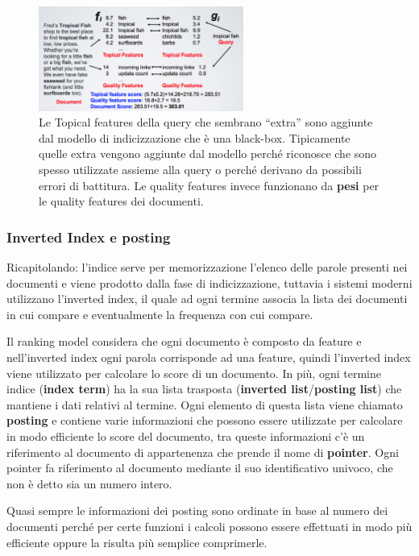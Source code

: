 \begin{figure}[htbp]
	\centering
	\includegraphics[width=0.6\textwidth]{./images/l6-modello-2}
	\caption{Le Topical features della query che sembrano ``extra'' sono aggiunte dal modello di indicizzazione che è una black-box. Tipicamente quelle extra vengono aggiunte dal modello perché riconosce che sono spesso utilizzate assieme alla query o perché derivano da possibili errori di battitura. Le quality features invece funzionano da \textbf{pesi} per le quality features dei documenti.}
\end{figure}

\subsubsection{Inverted Index e posting}

Ricapitolando: l'indice serve per memorizzazione l'elenco delle parole presenti nei documenti e viene prodotto dalla fase di indicizzazione, tuttavia i sistemi moderni utilizzano l'inverted index, il quale ad ogni termine associa la lista dei documenti in cui compare e eventualmente la frequenza con cui compare. 

Il ranking model considera che ogni documento è composto da feature e nell'inverted index ogni parola corrisponde ad una feature, quindi l'inverted index viene utilizzato per calcolare lo score di un documento.
In più, ogni termine indice (\textbf{index term}) ha la sua lista trasposta (\textbf{inverted list}/\textbf{posting list}) che mantiene i dati relativi al termine.
Ogni elemento di questa lista viene chiamato \textbf{posting} e contiene varie informazioni che possono essere utilizzate per calcolare in modo efficiente lo score del documento, tra queste informazioni c'è un riferimento al documento di appartenenza che prende il nome di \textbf{pointer}.
Ogni pointer fa riferimento al documento mediante il suo identificativo univoco, che non è detto sia un numero intero.

Quasi sempre le informazioni dei posting sono ordinate in base al numero dei documenti perché per certe funzioni i calcoli possono essere effettuati in modo più efficiente oppure la risulta più semplice comprimerle.

